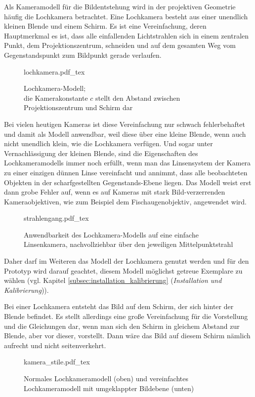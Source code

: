 Als Kameramodell für die Bildentstehung wird in der projektiven Geometrie häufig die Lochkamera betrachtet. Eine Lochkamera besteht aus einer unendlich kleinen Blende und einem Schirm. Es ist eine Vereinfachung, deren Hauptmerkmal es ist, dass alle einfallenden Lichtstrahlen sich in einem zentralen Punkt, dem Projektionszentrum, schneiden und auf dem gesamten Weg vom Gegenstandspunkt zum Bildpunkt gerade verlaufen.%

\begin{figure}[H]
	\centering
	\def\svgwidth{10cm}
	{lochkamera.pdf_tex}
	\caption[Lochkamera-Modell]{Lochkamera-Modell;\\ die Kamerakonstante $c$ stellt den Abstand zwischen Projektionszentrum und Schirm dar}
	\label{fig:lochkamera}
\end{figure}

\noindent Bei vielen heutigen Kameras ist diese Vereinfachung nur schwach fehlerbehaftet und damit als Modell anwendbar, weil diese über eine kleine Blende, wenn auch nicht unendlich klein, wie die Lochkamera verfügen. Und sogar unter Vernachlässigung der kleinen Blende, sind die Eigenschaften des Lochkameramodells immer noch erfüllt, wenn man das Linsensystem der Kamera zu einer einzigen dünnen Linse vereinfacht und annimmt, dass alle beobachteten Objekten in der scharfgestellten Gegenstands-Ebene liegen. Das Modell weist erst dann grobe Fehler auf, wenn es auf Kameras mit stark Bild-verzerrenden Kameraobjektiven, wie zum Beispiel dem Fischaugenobjektiv, angewendet wird.

\begin{figure}[H]
	\centering
	\def\svgwidth{10cm}
	{strahlengang.pdf_tex}
	\caption[Anwendbarkeit des Lochkamera-Modells auf eine einfache Linsenkamera]{Anwendbarkeit des Lochkamera-Modells auf eine einfache Linsenkamera, nachvollziehbar über den jeweiligen Mittelpunktstrahl}
	\label{fig:strahlengang}
\end{figure}

\noindent Daher darf im Weiteren das Modell der Lochkamera genutzt werden und für den Prototyp wird darauf geachtet, diesem Modell möglichst getreue Exemplare zu wählen (vgl. Kapitel \ref{subsec:installation_kalibrierung} (\emph{Installation und Kalibrierung})).\mittelgrosserabstand

Bei einer Lochkamera entsteht das Bild auf dem Schirm, der sich hinter der Blende befindet. Es stellt allerdings eine große Vereinfachung für die Vorstellung und die Gleichungen dar, wenn man sich den Schirm in gleichem Abstand zur Blende, aber vor dieser, vorstellt. Dann wäre das Bild auf diesem Schirm nämlich aufrecht und nicht seitenverkehrt.

\begin{figure}[H]
	\centering
	\def\svgwidth{10cm}
	{kamera_stile.pdf_tex}
	\caption[Normales Lochkameramodell und vereinfachtes Lochkameramodell mit umgeklappter Bildebene]{Normales Lochkameramodell (oben) und vereinfachtes Lochkameramodell mit umgeklappter Bildebene (unten)}
	\label{fig:kamera_stile}
\end{figure}
